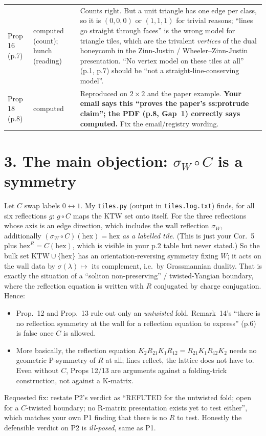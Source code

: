 \documentclass[11pt]{article}
\newcommand{\hexR}{\mathrm{hex}^{R}}
\newcommand{\hex}{\mathrm{hex}}
\begin{document}
{\begin{tabular}{@{}p{3.6cm}p{2.3cm}p{9.6cm}@{}}
Prop 16 (p.7) & computed (count); hunch (reading) & Counts right. But a unit triangle has one edge per class, so it is $(0,0,0)$ or $(1,1,1)$ for trivial reasons; ``lines go straight through faces'' is the wrong model for triangle tiles, which are the trivalent \emph{vertices} of the dual honeycomb in the Zinn-Justin / Wheeler--Zinn-Justin presentation. ``No vertex model on these tiles at all'' (p.1, p.7) should be ``not a straight-line-conserving model''.\\
Prop 18 (p.8) & computed & Reproduced on $2\times2$ and the paper example. \textbf{Your email says this ``proves the paper's ss:protrude claim''; the PDF (p.8, Gap~1) correctly says computed.} Fix the email/registry wording.\\
\bottomrule\end{tabular}}

\section*{3. The main objection: $\sigma_W\circ C$ is a symmetry}
Let $C$ swap labels $0\leftrightarrow1$. My \texttt{tiles.py} (output in \texttt{tiles.log.txt}) finds, for all six reflections $g$: $g\circ C$ maps the KTW set onto itself. For the three reflections whose axis is an edge direction, which includes the wall reflection $\sigma_W$, additionally $(\sigma_W\circ C)(\hex)=\hex$ \emph{as a labelled tile}. (This is just your Cor.~5 plus $\hexR = C(\hex)$, which is visible in your p.2 table but never stated.) So the bulk set $\mathrm{KTW}\cup\{\hex\}$ has an orientation-reversing symmetry fixing $W$; it acts on the wall data by $\sigma(\lambda)\mapsto$ its complement, i.e.\ by Grassmannian duality. That is exactly the situation of a ``soliton non-preserving'' / twisted-Yangian boundary, where the reflection equation is written with $R$ conjugated by charge conjugation. Hence:
\begin{itemize}\itemsep0pt
\item Prop.~12 and Prop.~13 rule out only an \emph{untwisted} fold. Remark~14's ``there is no reflection symmetry at the wall for a reflection equation to express'' (p.6) is false once $C$ is allowed.
\item More basically, the reflection equation $K_2R_{21}K_1R_{12}=R_{21}K_1R_{12}K_2$ needs no geometric P-symmetry of $R$ at all; lines reflect, the lattice does not have to. Even without $C$, Props 12/13 are arguments against a folding-trick construction, not against a K-matrix.
\end{itemize}
Requested fix: restate P2's verdict as ``REFUTED for the untwisted fold; open for a $C$-twisted boundary; no R-matrix presentation exists yet to test either'', which matches your own P1 finding that there is no $R$ to test. Honestly the defensible verdict on P2 is \emph{ill-posed}, same as P1.
\end{document}
